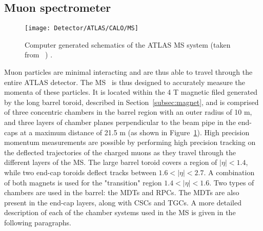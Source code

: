 	\subsection{Muon spectrometer}
	\label{subsec:muon_spec}
	\begin{figure}[!hbt]
		\centering
		\texttt{[image: Detector/ATLAS/CALO/MS]}
		\caption{Computer generated schematics of the \ac{ATLAS} \ac{MS} system (taken from ~\cite{ATLASJINST}) .}
		\label{fig:muon_spectrometer}
	\end{figure}
	Muon particles are minimal interacting and are thus able to travel through the entire \ac{ATLAS} detector. 
	The \ac{MS}~\cite{MSTDR} is thus designed to accurately measure the momenta of these particles. 
	It is located within the 4 T magnetic filed generated by the long barrel toroid, described in Section~\ref{subsec:magnet}, and is comprised of three concentric chambers in the barrel region with an outer radius of 10 m, and three layers of chamber planes perpendicular to the beam pipe in the end-caps at a maximum distance of 21.5 m (as shown in Figure~\ref{fig:muon_spectrometer}). 
	High precision momentum measurements are possible by performing high precision tracking on the deflected trajectories of the charged muons as they travel through the different layers of the \ac{MS}.
	The large barrel toroid covers a region of $|\eta|<1.4$, while two end-cap toroids deflect tracks between $1.6<|\eta|<2.7$. 
	A combination of both magnets is used for the "transition" region $1.4<|\eta|<1.6$.
	Two types of chambers are used in the barrel: the \acp{MDT} and \acp{RPC}. The \acp{MDT} are also present in the end-cap layers, along with \acp{CSC} and \acp{TGC}. A more detailed description of each of the chamber systems used in the \ac{MS} is given in the following paragraphs. 
